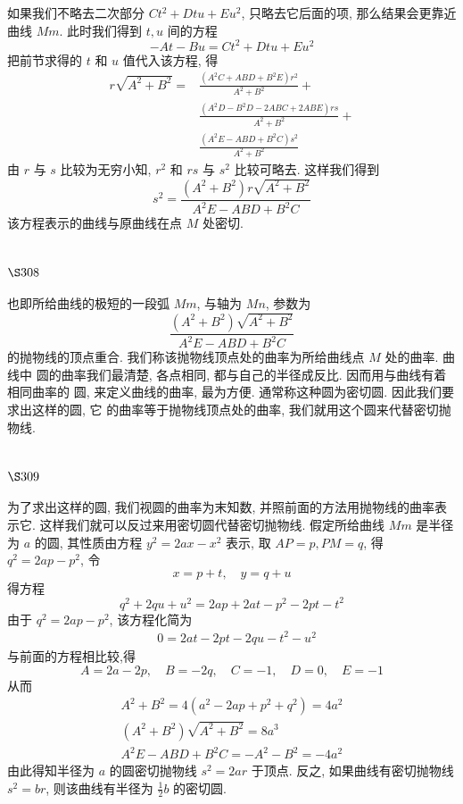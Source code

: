 如果我们不略去二次部分 $C t^{2}+D t u+E u^{2}$, 只略去它后面的项, 那么结果会更靠近 曲线 $M m$. 此时我们得到 $t, u$ 间的方程
\[
-A t-B u=C t^{2}+D t u+E u^{2}
\]
把前节求得的 $t$ 和 $u$ 值代入该方程, 得
\[
\begin{aligned}
r \sqrt{A^{2}+B^{2}}= & \frac{\left(A^{2} C+A B D+B^{2} E\right) r^{2}}{A^{2}+B^{2}}+ \\
& \frac{\left(A^{2} D-B^{2} D-2 A B C+2 A B E\right) r s}{A^{2}+B^{2}}+ \\
& \frac{\left(A^{2} E-A B D+B^{2} C\right) s^{2}}{A^{2}+B^{2}}
\end{aligned}
\]
由 $r$ 与 $s$ 比较为无穷小知, $r^{2}$ 和 $r s$ 与 $s^{2}$ 比较可略去. 这样我们得到
\[
s^{2}=\frac{\left(A^{2}+B^{2}\right) r \sqrt{A^{2}+B^{2}}}{A^{2} E-A B D+B^{2} C}
\]
该方程表示的曲线与原曲线在点 $M$ 处密切.

\section{$\S 308$}

也即所给曲线的极短的一段弧 $M m$, 与轴为 $M n$, 参数为
\[
\frac{\left(A^{2}+B^{2}\right) \sqrt{A^{2}+B^{2}}}{A^{2} E-A B D+B^{2} C}
\]
的抛物线的顶点重合. 我们称该抛物线顶点处的曲率为所给曲线点 $M$ 处的曲率. 曲线中 圆的曲率我们最清楚, 各点相同, 都与自己的半径成反比. 因而用与曲线有着相同曲率的 圆, 来定义曲线的曲率, 最为方便. 通常称这种圆为密切圆. 因此我们要求出这样的圆, 它 的曲率等于抛物线顶点处的曲率, 我们就用这个圆来代替密切抛物线.

\section{$\S 309$}

为了求出这样的圆, 我们视圆的曲率为末知数, 并照前面的方法用抛物线的曲率表 示它. 这样我们就可以反过来用密切圆代替密切抛物线. 假定所给曲线 $M m$ 是半径为 $a$ 的圆, 其性质由方程 $y^{2}=2 a x-x^{2}$ 表示, 取 $A P=p, P M=q$, 得 $q^{2}=2 a p-p^{2}$, 令
\[
x=p+t, \quad y=q+u
\]
得方程
\[
q^{2}+2 q u+u^{2}=2 a p+2 a t-p^{2}-2 p t-t^{2}
\]
由于 $q^{2}=2 a p-p^{2}$, 该方程化简为 
\[
\begin{aligned}
& 0=2 a t-2 p t-2 q u-t^{2}-u^{2}
\end{aligned}
\]
与前面的方程相比较,得
\[
A=2 a-2 p, \quad B=-2 q, \quad C=-1, \quad D=0, \quad E=-1
\]
从而
\[
\begin{gathered}
A^{2}+B^{2}=4\left(a^{2}-2 a p+p^{2}+q^{2}\right)=4 a^{2} \\
\left(A^{2}+B^{2}\right) \sqrt{A^{2}+B^{2}}=8 a^{3} \\
A^{2} E-A B D+B^{2} C=-A^{2}-B^{2}=-4 a^{2}
\end{gathered}
\]
由此得知半径为 $a$ 的圆密切抛物线 $s^{2}=2 a r$ 于顶点. 反之, 如果曲线有密切抛物线 $s^{2}=b r$, 则该曲线有半径为 $\frac{1}{2} b$ 的密切圆.

